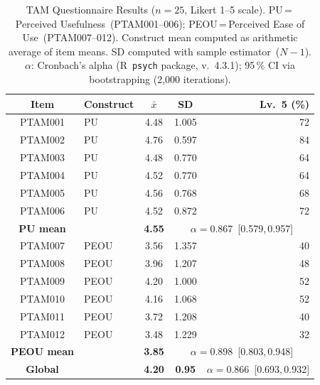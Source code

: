 \documentclass[journal]{IEEEtran}
\begin{document}
	\begin{table}[!t]
		\caption{TAM Questionnaire Results ($n{=}25$, Likert 1--5 scale).
			PU\,=\,Perceived Usefulness~(PTAM001--006);
			PEOU\,=\,Perceived Ease of Use~(PTAM007--012).
			Construct mean computed as arithmetic average of item means.
			SD computed with sample estimator~($N-1$).
			$\alpha$: Cronbach's alpha (R~\texttt{psych} package, v.~4.3.1);
			95\,\% CI via bootstrapping (2{,}000 iterations).}
		\label{tab:tam}
		\centering
		\small
		\renewcommand{\arraystretch}{1.25}
		\begin{tabular}{clccr}
			\toprule
			\textbf{Item} & \textbf{Construct} & \textbf{$\bar{x}$} & \textbf{SD} & \textbf{Lv.~5 (\%)} \\
			\midrule
			PTAM001 & PU  & 4.48 & 1.005 & 72 \\
			PTAM002 & PU  & 4.76 & 0.597 & 84 \\
			PTAM003 & PU  & 4.48 & 0.770 & 64 \\
			PTAM004 & PU  & 4.52 & 0.770 & 64 \\
			PTAM005 & PU  & 4.56 & 0.768 & 68 \\
			PTAM006 & PU  & 4.52 & 0.872 & 72 \\
			\midrule
			\textbf{PU mean} & & \textbf{4.55} & \multicolumn{2}{c}{$\alpha{=}0.867$~[0.579,\,0.957]} \\
			\midrule
			PTAM007 & PEOU & 3.56 & 1.357 & 40 \\
			PTAM008 & PEOU & 3.96 & 1.207 & 48 \\
			PTAM009 & PEOU & 4.20 & 1.000 & 52 \\
			PTAM010 & PEOU & 4.16 & 1.068 & 52 \\
			PTAM011 & PEOU & 3.72 & 1.208 & 40 \\
			PTAM012 & PEOU & 3.48 & 1.229 & 32 \\
			\midrule
			\textbf{PEOU mean} & & \textbf{3.85} & \multicolumn{2}{c}{$\alpha{=}0.898$~[0.803,\,0.948]} \\
			\midrule
			\textbf{Global} & & \textbf{4.20} & \textbf{0.95} & $\alpha{=}0.866$~[0.693,\,0.932] \\
			\bottomrule
		\end{tabular}
	\end{table}
	
\end{document}
